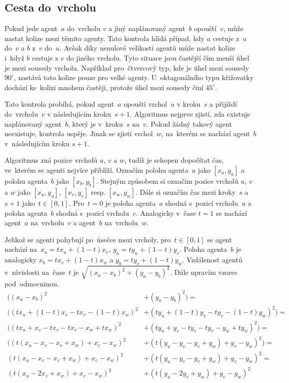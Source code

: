 \subsection{Cesta do~vrcholu}\label{subsec:cesta_do_vrcholu}

Pokud jede agent~$a$ do~vrcholu $v$ a jiný naplánovaný agent~$b$ opouští~$v$, může nastat kolize mezi těmito agenty.
Tato kontrola hlídá případ, kdy $a$ cestuje z~$u$ do~$v$ a $b$ z~$v$ do~$u$.
Avšak díky nenulové velikosti agentů může nastat kolize i~když $b$ cestuje z $v$ do jiného vrcholu.
Tyto situace jsou častější čím menší úhel je mezi sousedy vrcholu.
Například pro~čtvercový typ, kde je úhel mezi sousedy $90^\circ$, nastává tato kolize pouze pro velké agenty.
U~oktagonálního typu křižovatky dochází ke~kolizi mnohem častěji, protože úhel mezi sousedy činí $45^\circ$.

Tato kontrola probíhá, pokud agent~$a$ opouští vrchol~$u$ v kroku~$s$ a přijíždí do~vrcholu~$v$ v následujícím kroku~$s + 1$.
Algoritmus nejprve zjistí, zda existuje naplánovaný agent~$b$, který je v~kroku~$s$ na~$v$.
Pokud žádný takový agent neexistuje, kontrola uspěje.
Jinak se zjistí vrchol~$w$, na~kterém se nachází agent~$b$ v~následujícím kroku $s + 1$.

Algoritmus zná pozice vrcholů $u$, $v$ a $w$, tudíž je schopen dopočítat čas, ve~kterém se agenti nejvíce přiblíží.
Označím polohu agenta~$a$ jako $[x_a, y_a]$ a polohu agenta~$b$ jako $[x_b, y_b]$.
Stejným způsobem si označím pozice vrcholů $u$, $v$ a $w$ jako $[x_u, y_u]$, $[x_v, y_v]$ resp. $[x_w, y_w]$.
Dále si označím čas mezi kroky~$s$ a $s + 1$ jako~$t\in[0, 1]$.
Pro~$t = 0$ je poloha agenta~$a$ shodná s~pozicí vrcholu~$u$ a poloha agenta~$b$ shodná s~pozicí vrcholu~$v$.
Analogicky v~čase $t = 1$ se nachází agent~$a$ na~vrcholu~$v$ a agent~$b$ na~vrcholu~$w$.

Jelikož se agenti pohybují po~úsečce mezi vrcholy, pro~$t\in[0, 1]$ se agent nachází na~$x_a = tx_u + (1 - t)x_v$, $y_a = ty_u + (1 - t)y_v$.
Poloha agenta~$b$ je analogicky $x_b = tx_v + (1 - t)x_w$ a $y_b = ty_v + (1 - t)y_w$.
Vzdálenost agentů v~závislosti na~čase~$t$ je $\sqrt{(x_a - x_b)^2 + (y_a - y_b)^2}$.
Dále upravím vzorec pod~odmocninou.
\begin{align*}
  ((x_a - x_b)^2 &+ (y_a - y_b)^2) = \\
  ((tx_u + (1 - t)x_v - tx_v - (1 - t)x_w)^2 &+ (ty_u + (1 - t)y_v - ty_v - (1 - t)y_w)^2) = \\
  ((tx_u + x_v - tx_v - tx_v - x_w + tx_w)^2 &+ (ty_u + y_v - ty_v - ty_v - y_w + ty_w)^2) = \\
  ((t(x_u - x_v - x_v + x_w) + x_v - x_w)^2 &+ (t(y_u - y_v - y_v + y_w) + y_v - y_w)^2) = \\
  (t(x_u - x_v - x_v + x_w) + x_v - x_w)^2 &+ (t(y_u - y_v - y_v + y_w) + y_v - y_w)^2 = \\
  (t(x_u - 2x_v + x_w) + x_v - x_w)^2 &+ (t(y_u - 2y_v + y_w) + y_v - y_w)^2 \\
\end{align*}

